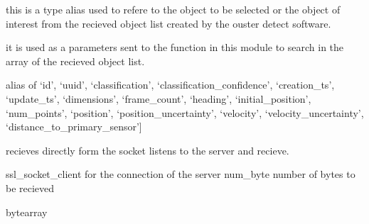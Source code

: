 \documentclass[letterpaper,10pt,english]{sphinxmanual}
\begin{document}
\begin{fulllineitems}
\label{\detokenize{utilities:utilities.utilities.object_key}}
\pysigstartsignatures
{}
\pysigstopsignatures\begin{description}
\sphinxAtStartPar
this is a type alias used to refere to the object to be selected or the object
of interest from the recieved object list created by the ouster detect software.

\sphinxAtStartPar
it is used as a parameters sent to the function in this module to search in
the array of the recieved object list.

\end{description}

\sphinxAtStartPar
alias of \sphinxcode{\sphinxupquote{Literal}}{[}‘id’, ‘uuid’, ‘classification’, ‘classification\_confidence’, ‘creation\_ts’, ‘update\_ts’, ‘dimensions’, ‘frame\_count’, ‘heading’, ‘initial\_position’, ‘num\_points’, ‘position’, ‘position\_uncertainty’, ‘velocity’, ‘velocity\_uncertainty’, ‘distance\_to\_primary\_sensor’{]}

\end{fulllineitems}


\begin{fulllineitems}
\label{\detokenize{utilities:utilities.utilities.recv_stream}}
\pysigstartsignatures
{}
\pysigstopsignatures\begin{description}
\sphinxAtStartPar
recieves directly form the socket listens to the server and recieve.

\sphinxAtStartPar
ssl\_socket\_client for the connection of the server
num\_byte number of bytes to be recieved

\sphinxAtStartPar
bytearray

\end{description}

\end{fulllineitems}
\end{document}
